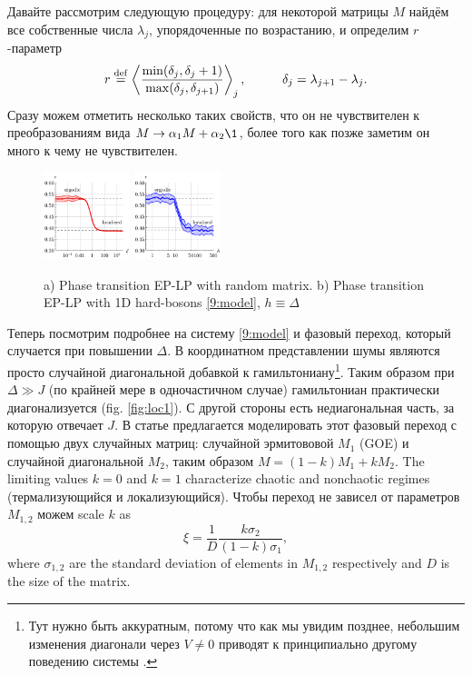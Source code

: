Давайте рассмотрим следующую процедуру: для некоторой матрицы $M$ найдём все собственные числа $\lambda_j$, упорядоченные по возрастанию, и определим $r$-параметр \cite{wei_characterization_2020} 
\begin{equation*}
    r \overset{\mathrm{def}}{=}  \left\langle \frac{\min(\delta_j, \delta_j+1)}{\max(\delta_j, \delta_{j+1})} \right\rangle_j,
    \hspace{10 mm} 
    \delta_j = \lambda_{j+1}-\lambda_j.
\end{equation*}
Сразу можем отметить несколько таких свойств, что он не чувствителен к преобразованиям вида $M \to \alpha_1 M + \alpha_2 \1$, более того как позже заметим он много к чему не чувствителен. 


\begin{figure}[tb]
    \centering
    \includegraphics[width=0.225\textwidth]{imgs/erg_reg_add1.pdf}
    \hspace{10 mm} 
    \includegraphics[width=0.225\textwidth]{imgs/erg_reg_add2.pdf}
    \caption{a) Phase transition EP-LP with random matrix. b)  Phase transition EP-LP with 1D hard-bosons \eqref{9:model}, $h \equiv \Delta$}
    \label{fig:rxi}
\end{figure}


Теперь посмотрим подробнее на систему \eqref{9:model} и фазовый переход, который случается при повышении $\Delta$. В координатном представлении шумы являются просто случайной диагональной добавкой к гамильтониану\footnote{
    Тут нужно быть аккуратным, потому что как мы увидим позднее, небольшим изменения диагонали через $V \neq 0$ приводят к принципиально другому поведению системы \cite{bardarson_unbounded_2012}. 
}. Таким образом при $\Delta \gg J$ (по крайней мере в одночастичном случае) гамильтониан практически диагонализуется (fig. \ref{fig:loc1}). С другой стороны есть недиагональная часть, за которую отвечает $J$. В статье \cite{wei_characterization_2020} предлагается моделировать этот фазовый переход с помощью двух случайных матриц: случайной эрмитововой $M_1$ (GOE) и случайной диагональной $M_2$, таким образом $M = (1-k) M_1 + k M_2$. The limiting values $k=0$ and $k=1$ characterize chaotic and nonchaotic regimes (термализующийся и локализующийся). Чтобы переход не зависел от параметров $M_{1,2}$ можем scale $k$ as
\begin{equation*}
    \xi = \frac{1}{D} \frac{k \sigma_2}{(1-k)\sigma_1},
\end{equation*}
where $\sigma_{1,2}$ are the standard deviation of elements in $M_{1,2}$ respectively and $D$ is the size of the matrix. 

